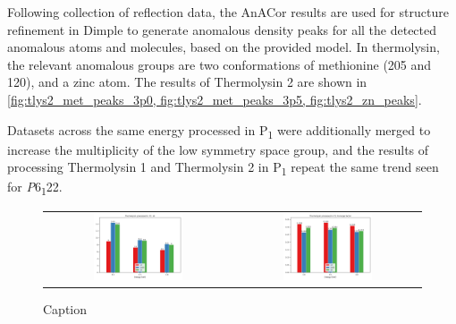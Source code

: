 Following collection of reflection data, the AnACor results are used for structure refinement in Dimple to generate anomalous density peaks for all the detected anomalous atoms and molecules, based on the provided model. In thermolysin, the relevant anomalous groups are two conformations of methionine (205 and 120), and a zinc atom. The results of Thermolysin 2 are shown in \cref{fig:tlys2_met_peaks_3p0, fig:tlys2_met_peaks_3p5, fig:tlys2_zn_peaks}.%

Datasets across the same energy processed in P\textsubscript{1} were additionally merged to increase the multiplicity of the low symmetry space group, and the results of processing Thermolysin 1 and Thermolysin 2 in P\textsubscript{1} repeat the same trend seen for \textit{P}6\textsubscript{1}22.

\begin{figure}[h]
    \centering
    \begin{tabular}{cc}
    \includegraphics[width = 0.5\textwidth]{plots/exp1/tlys_9_P1/I_over_sigma.png} & \includegraphics[width = 0.5\textwidth]{plots/exp1/tlys_9_P1/rmerges.png}
    \end{tabular}
    \caption{Caption}
    \label{fig:tlys_2_p6}
\end{figure}

